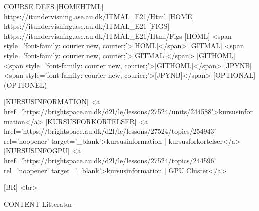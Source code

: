 COURSE
DEFS 
	[HOMEHTML] https://itundervisning.ase.au.dk/ITMAL_E21/Html
	[HOME]     https://itundervisning.ase.au.dk/ITMAL_E21
	[FIGS]     https://itundervisning.ase.au.dk/ITMAL_E21/Html/Figs
	[HOML]     <span style='font-family: courier new, courier;'>[HOML]</span>
	[GITMAL]   <span style='font-family: courier new, courier;'>[GITMAL]</span>
	[GITHOML]  <span style='font-family: courier new, courier;'>[GITHOML]</span>
	[JPYNB]    <span style='font-family: courier new, courier;'>[JPYNB]</span>
	[OPTIONAL] (OPTIONEL)

	[KURSUSINFORMATION]  <a href='https://brightspace.au.dk/d2l/le/lessons/27524/units/244588'>kursusinformation</a>
	[KURSUSFORKORTELSER] <a href='https://brightspace.au.dk/d2l/le/lessons/27524/topics/254943' rel='noopener' target='_blank'>kursusinformation | kursusforkortelser</a>
	[KURSUSINFOGPU]      <a href='https://brightspace.au.dk/d2l/le/lessons/27524/topics/244596' rel='noopener' target='_blank'>kursusinformation | GPU Cluster</a>
	
	[BR] <br>


CONTENT Litteratur







